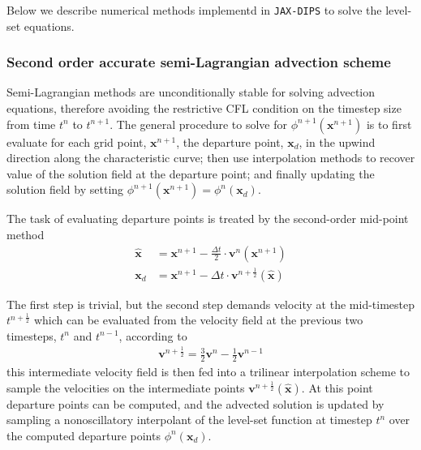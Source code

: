 \documentclass{elsarticle}
\begin{document}
Below we describe numerical methods implementd in \texttt{JAX-DIPS} to solve the level-set equations.

\subsubsection{Second order accurate semi-Lagrangian advection scheme}
Semi-Lagrangian methods are unconditionally stable for solving advection equations, therefore avoiding the restrictive CFL condition on the timestep size from time $t^n$ to $t^{n+1}$. The general procedure to solve for $\phi^{n+1}(\mathbf{x}^{n+1})$ is to first evaluate for each grid point, $\mathbf{x}^{n+1}$, the departure point, $\mathbf{x}_d$, in the upwind direction along the characteristic curve; then use interpolation methods to recover value of the solution field at the departure point; and finally updating the solution field by setting $\phi^{n+1}(\mathbf{x}^{n+1})=\phi^n(\mathbf{x}_d)$.

The task of evaluating departure points is treated by the second-order mid-point method \cite{XIU2001658}
\begin{align*}
	\hat{\mathbf{x}} &= \mathbf{x}^{n+1} - \frac{\Delta t}{2} \cdot \mathbf{v}^n(\mathbf{x}^{n+1})\\
	\mathbf{x}_d &= \mathbf{x}^{n+1} - \Delta t \cdot \mathbf{v}^{n+\frac{1}{2}}(\hat{\mathbf{x}})
\end{align*}

The first step is trivial, but the second step demands velocity at the mid-timestep $t^{n + \frac{1}{2}}$ which can be evaluated from the velocity field at the previous two timesteps, $t^n$ and $t^{n-1}$, according to
\begin{align*}
	\mathbf{v}^{n+\frac{1}{2}} = \frac{3}{2}\mathbf{v}^n - \frac{1}{2} \mathbf{v}^{n-1}
\end{align*}
this intermediate velocity field is then fed into a trilinear interpolation scheme to sample the velocities on the intermediate points $\mathbf{v}^{n+\frac{1}{2}}(\hat{\mathbf{x}})$. At this point departure points can be computed, and the advected solution is updated by sampling a nonoscillatory interpolant of the level-set function at timestep $t^n$ over the computed departure points $\phi^n(\mathbf{x}_d)$.
\end{document}
